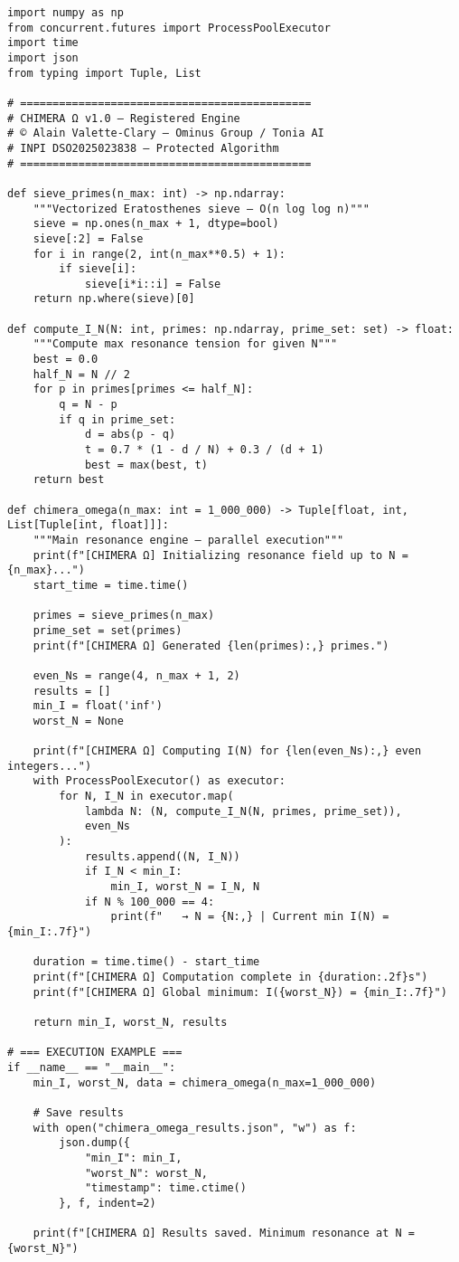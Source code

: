 \documentclass[12pt,a4paper]{article}
\begin{document}
\begin{lstlisting}[caption={CHIMERA Ω v1.0 — Complete Executable Source (INPI DSO2025023838)}, label={lst:full_code}]
import numpy as np
from concurrent.futures import ProcessPoolExecutor
import time
import json
from typing import Tuple, List

# =============================================
# CHIMERA Ω v1.0 — Registered Engine
# © Alain Valette-Clary – Ominus Group / Tonia AI
# INPI DSO2025023838 — Protected Algorithm
# =============================================

def sieve_primes(n_max: int) -> np.ndarray:
    """Vectorized Eratosthenes sieve — O(n log log n)"""
    sieve = np.ones(n_max + 1, dtype=bool)
    sieve[:2] = False
    for i in range(2, int(n_max**0.5) + 1):
        if sieve[i]:
            sieve[i*i::i] = False
    return np.where(sieve)[0]

def compute_I_N(N: int, primes: np.ndarray, prime_set: set) -> float:
    """Compute max resonance tension for given N"""
    best = 0.0
    half_N = N // 2
    for p in primes[primes <= half_N]:
        q = N - p
        if q in prime_set:
            d = abs(p - q)
            t = 0.7 * (1 - d / N) + 0.3 / (d + 1)
            best = max(best, t)
    return best

def chimera_omega(n_max: int = 1_000_000) -> Tuple[float, int, List[Tuple[int, float]]]:
    """Main resonance engine — parallel execution"""
    print(f"[CHIMERA Ω] Initializing resonance field up to N = {n_max}...")
    start_time = time.time()
    
    primes = sieve_primes(n_max)
    prime_set = set(primes)
    print(f"[CHIMERA Ω] Generated {len(primes):,} primes.")
    
    even_Ns = range(4, n_max + 1, 2)
    results = []
    min_I = float('inf')
    worst_N = None
    
    print(f"[CHIMERA Ω] Computing I(N) for {len(even_Ns):,} even integers...")
    with ProcessPoolExecutor() as executor:
        for N, I_N in executor.map(
            lambda N: (N, compute_I_N(N, primes, prime_set)),
            even_Ns
        ):
            results.append((N, I_N))
            if I_N < min_I:
                min_I, worst_N = I_N, N
            if N % 100_000 == 4:
                print(f"   → N = {N:,} | Current min I(N) = {min_I:.7f}")
    
    duration = time.time() - start_time
    print(f"[CHIMERA Ω] Computation complete in {duration:.2f}s")
    print(f"[CHIMERA Ω] Global minimum: I({worst_N}) = {min_I:.7f}")
    
    return min_I, worst_N, results

# === EXECUTION EXAMPLE ===
if __name__ == "__main__":
    min_I, worst_N, data = chimera_omega(n_max=1_000_000)
    
    # Save results
    with open("chimera_omega_results.json", "w") as f:
        json.dump({
            "min_I": min_I,
            "worst_N": worst_N,
            "timestamp": time.ctime()
        }, f, indent=2)
    
    print(f"[CHIMERA Ω] Results saved. Minimum resonance at N = {worst_N}")
\end{lstlisting}
\end{document}
